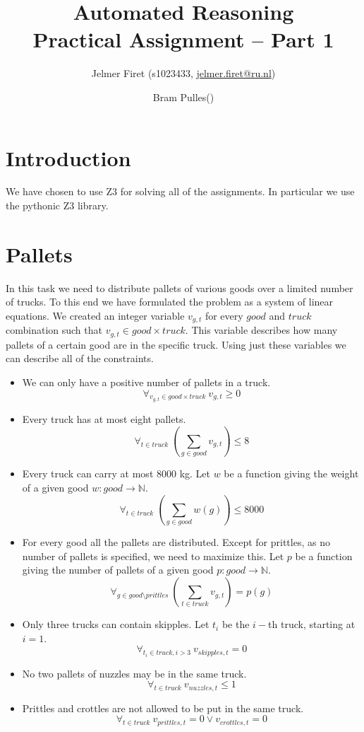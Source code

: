 \documentclass{scrartcl}
\author{Jelmer Firet (s1023433, \href{mailto:jelmer.firet@ru.nl}{jelmer.firet@ru.nl}) \and
        Bram Pulles()}
\title{\textbf{Automated Reasoning\\Practical Assignment -- Part 1}}
\begin{document}
\maketitle

\section{Introduction}
We have chosen to use Z3 for solving all of the assignments. In particular we
use the pythonic Z3 library.

\section{Pallets}
In this task we need to distribute pallets of various goods over a limited
number of trucks. To this end we have formulated the problem as a system of
linear equations. We created an integer variable $v_{g,t}$ for every $good$ and
$truck$ combination such that $v_{g,t} \in good \times truck$. This variable
describes how many pallets of a certain good are in the specific truck. Using
just these variables we can describe all of the constraints.

\begin{itemize}
	\item
		We can only have a positive number of pallets in a truck.
		\[ \forall_{v_{g,t} \in good \times truck}\ v_{g,t} \geq 0 \]
	\item
		Every truck has at most eight pallets.
		\[ \forall_{t \in truck}\ \left( \sum_{g \in good} v_{g,t} \right) \leq 8 \]
	\item
		Every truck can carry at most 8000 kg. Let $w$ be a function giving the
		weight of a given good $w: good \to \mathbb{N}$.
		\[ \forall_{t \in truck}\ \left( \sum_{g \in good} w(g) \right) \leq 8000 \]
	\item
		For every good all the pallets are distributed. Except for prittles, as
		no number of pallets is specified, we need to maximize this. Let $p$ be
		a function giving the number of pallets of a given good $p: good \to
		\mathbb{N}$.
		\[
		\forall_{g \in good \setminus prittles}\
		\left( \sum_{t \in truck} v_{g,t} \right) = p(g)
		\]
	\item
		Only three trucks can contain skipples. Let $t_i$ be the $i-$th truck,
		starting at $i = 1$.
		\[ \forall_{t_i \in truck, i > 3 }\ v_{skipples,t} = 0 \]
	\item
		No two pallets of nuzzles may be in the same truck.
		\[ \forall_{t \in truck}\ v_{nuzzles,t} \leq 1 \]
	\item
		Prittles and crottles are not allowed to be put in the same truck.
		\[ \forall_{t \in truck}\ v_{prittles,t} = 0 \lor v_{crottles,t} = 0 \]
\end{itemize}
\end{document}
